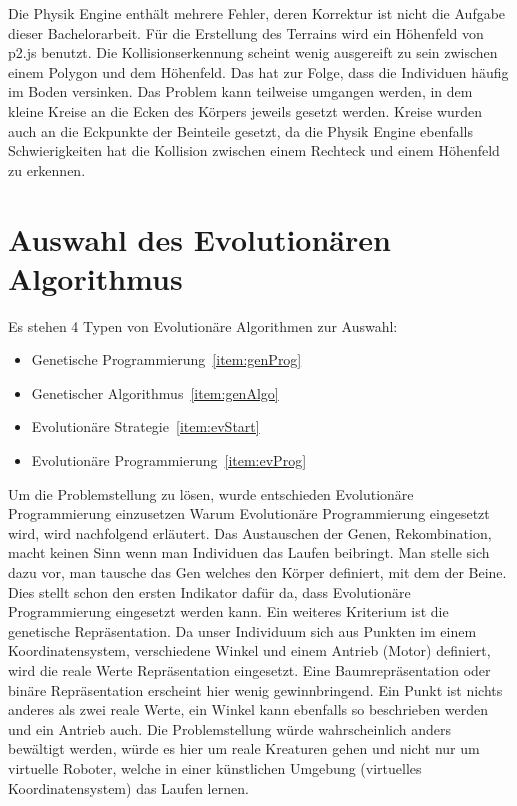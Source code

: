     Die Physik Engine enthält mehrere Fehler, deren Korrektur ist nicht die Aufgabe dieser Bachelorarbeit.
    Für die Erstellung des Terrains wird ein Höhenfeld von p2.js benutzt.
    Die Kollisionserkennung scheint wenig ausgereift zu sein
    zwischen einem Polygon und dem Höhenfeld. Das hat zur Folge, dass die Individuen häufig im Boden versinken.
    Das Problem kann teilweise umgangen werden, in dem kleine Kreise an die Ecken des Körpers jeweils gesetzt werden.
    Kreise wurden auch an die Eckpunkte der Beinteile gesetzt,
    da die Physik Engine ebenfalls Schwierigkeiten hat die Kollision
    zwischen einem Rechteck und einem Höhenfeld zu erkennen.

  \section{Auswahl des Evolutionären Algorithmus}

    Es stehen 4 Typen von Evolutionäre Algorithmen zur Auswahl:
    \begin{itemize}
      \item Genetische Programmierung~\ref{item:genProg}
      \item Genetischer Algorithmus~\ref{item:genAlgo}
      \item Evolutionäre Strategie~\ref{item:evStart}
      \item Evolutionäre Programmierung~\ref{item:evProg}
    \end{itemize}
    Um die Problemstellung zu lösen, wurde entschieden Evolutionäre Programmierung einzusetzen
    Warum Evolutionäre Programmierung eingesetzt wird, wird nachfolgend erläutert.
    Das Austauschen der Genen, Rekombination, macht keinen Sinn wenn man Individuen das Laufen beibringt.
    Man stelle sich dazu vor, man tausche das Gen welches den Körper definiert, mit dem der Beine.
    Dies stellt schon den ersten Indikator dafür da,
    dass Evolutionäre Programmierung eingesetzt werden kann. Ein weiteres Kriterium ist die genetische Repräsentation.
    Da unser Individuum sich aus Punkten im einem Koordinatensystem,
    verschiedene Winkel und einem Antrieb (Motor) definiert, wird die reale Werte Repräsentation eingesetzt.
    Eine Baumrepräsentation oder binäre Repräsentation erscheint hier wenig gewinnbringend.
    Ein Punkt ist nichts anderes als zwei reale Werte,
    ein Winkel kann ebenfalls so beschrieben werden und ein Antrieb auch.
    Die Problemstellung würde wahrscheinlich anders bewältigt werden,
    würde es hier um reale Kreaturen gehen und nicht nur um virtuelle Roboter,
    welche in einer künstlichen Umgebung (virtuelles Koordinatensystem) das Laufen lernen.

